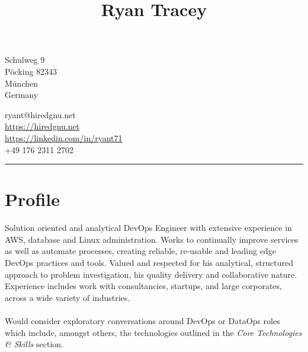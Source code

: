 \documentclass[10pt]{article}
\title{\bfseries\huge Ryan Tracey}
\author{}
\date{}
\begin{document}
\maketitle
\begin{minipage}[ht]{0.48\textwidth}
Schulweg 9\\
Pöcking 82343\\
München\\
Germany
\end{minipage}
\begin{minipage}[ht]{0.48\textwidth}
\hspace{5pt}ryant@hiredgnu.net\\
\hspace{5pt}\url{https://hiredgnu.net}\\
\hspace{5pt}\url{https://linkedin.com/in/ryant71}\\
\Mobilefone\hspace{5pt}+49 176 2311 2702\\
\color{red}{\Bat}\hspace{2pt}\male
\end{minipage}
\vspace{20pt}
\hrule
\vspace{10pt}
\section*{Profile}
Solution oriented and analytical DevOps Engineer with extensive experience in AWS, database and Linux administration. Works to continually improve services as well as automate processes, creating reliable, re-usable and leading edge DevOps practices and tools.
Valued and respected for his analytical, structured approach to problem investigation, his quality delivery and collaborative nature.  Experience includes work with consultancies, startups, and large corporates, across a wide variety of industries.\\\\
Would consider exploratory conversations around DevOps or DataOps roles which include, amongst others, the technologies outlined in the \textit{Core Technologies  \& Skills} section.
\end{document}

